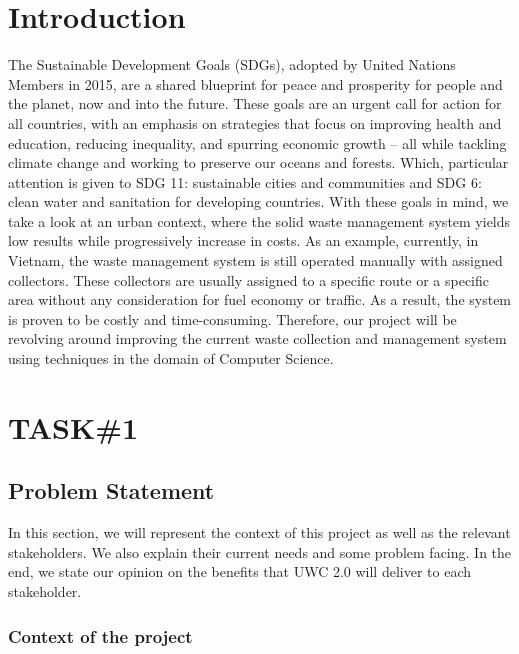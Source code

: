 \documentclass[a4paper, 13pt]{article}
\begin{document}
\section{Introduction}
The Sustainable Development Goals (SDGs), adopted by United Nations Members in 2015, are a shared blueprint for peace and prosperity for people and the planet, now and into the future. These goals are an urgent call for action for all countries, with an emphasis on strategies that focus on improving health and education, reducing inequality, and spurring economic growth – all while tackling climate change and working to preserve our oceans and forests. Which, particular attention is given to SDG 11: sustainable cities and communities and SDG 6: clean water and sanitation for developing countries. With these goals in mind, we take a look at an urban context, where the solid waste management system yields low results while progressively increase in costs. As an example, currently, in Vietnam, the waste management system is still operated manually with assigned collectors. These collectors are usually assigned to a specific route or a specific area without any consideration for fuel economy or traffic. As a result, the system is proven to be costly and time-consuming. Therefore, our project will be revolving around improving the current waste collection and management system using techniques in the domain of Computer Science.

\section{TASK\#1}

\subsection{Problem Statement}
\begin{tcolorbox}[colback=blue!5!white,colframe=blue!75!black]
  In this section, we will represent the context of this project as well as the relevant stakeholders. We also explain their current needs and some problem facing. In the end, we state our opinion on the benefits that UWC 2.0 will deliver to each stakeholder.
\end{tcolorbox}

\subsubsection{Context of the project}
\end{document}
